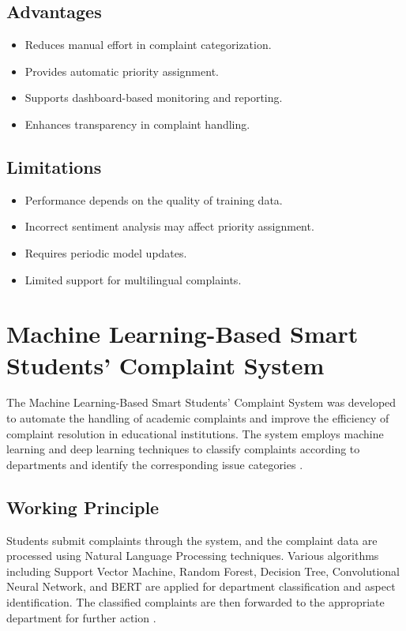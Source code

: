 \documentclass[12pt,a4paper]{report}
\begin{document}
\subsection{Advantages}
\begin{itemize}[nolistsep]
    \item Reduces manual effort in complaint categorization.
    \item Provides automatic priority assignment.
    \item Supports dashboard-based monitoring and reporting.
    \item Enhances transparency in complaint handling.
\end{itemize}

\subsection{Limitations}
\begin{itemize}[nolistsep]
    \item Performance depends on the quality of training data.
    \item Incorrect sentiment analysis may affect priority assignment.
    \item Requires periodic model updates.
    \item Limited support for multilingual complaints.
\end{itemize}

\section{Machine Learning-Based Smart Students' Complaint System}
The Machine Learning-Based Smart Students' Complaint System was developed to automate the handling of academic complaints and improve the efficiency of complaint resolution in educational institutions. The system employs machine learning and deep learning techniques to classify complaints according to departments and identify the corresponding issue categories \cite{javed2025}.

\subsection{Working Principle}
Students submit complaints through the system, and the complaint data are processed using Natural Language Processing techniques. Various algorithms including Support Vector Machine, Random Forest, Decision Tree, Convolutional Neural Network, and BERT are applied for department classification and aspect identification. The classified complaints are then forwarded to the appropriate department for further action \cite{javed2025}.
\end{document}
